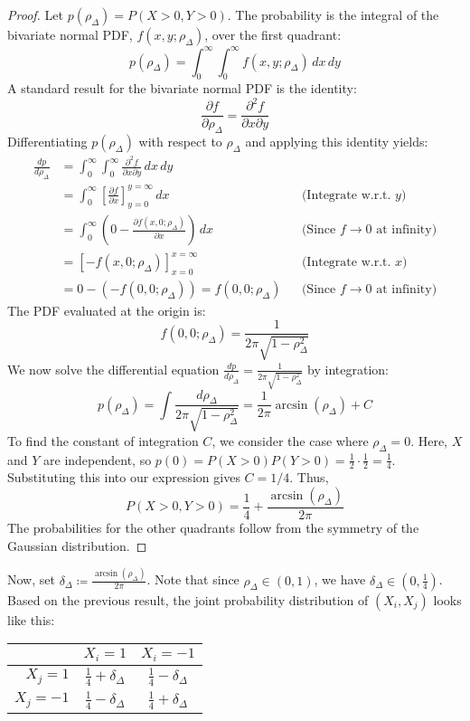 \documentclass[../../main.tex]{subfiles}
\begin{document}
\begin{proof}
Let $p(\rho_\Delta) = P(X > 0, Y > 0)$. The probability is the integral of the bivariate normal PDF, $f(x, y; \rho_\Delta)$, over the first quadrant:
$$
p(\rho_\Delta) = \int_0^\infty \int_0^\infty f(x, y; \rho_\Delta) \,dx\,dy
$$
A standard result for the bivariate normal PDF is the identity:
$$
\frac{\partial f}{\partial \rho_\Delta} = \frac{\partial^2 f}{\partial x \partial y}
$$
Differentiating $p(\rho_\Delta)$ with respect to $\rho_\Delta$ and applying this identity yields:
\begin{align*}
    \frac{dp}{d\rho_\Delta} &= \int_0^\infty \int_0^\infty \frac{\partial^2 f}{\partial x \partial y} \,dx\,dy \\
    &= \int_0^\infty \left[ \frac{\partial f}{\partial x} \right]_{y=0}^{y=\infty} \,dx && \text{(Integrate w.r.t. } y\text{)} \\
    &= \int_0^\infty \left( 0 - \frac{\partial f(x, 0; \rho_\Delta)}{\partial x} \right) \,dx && \text{(Since } f \to 0 \text{ at infinity)} \\
    &= \left[ -f(x, 0; \rho_\Delta) \right]_{x=0}^{x=\infty} && \text{(Integrate w.r.t. } x\text{)} \\
    &= 0 - (-f(0, 0; \rho_\Delta)) = f(0, 0; \rho_\Delta) && \text{(Since } f \to 0 \text{ at infinity)}
\end{align*}
The PDF evaluated at the origin is:
$$
f(0, 0; \rho_\Delta) = \frac{1}{2\pi\sqrt{1-\rho_\Delta^2}}
$$
We now solve the differential equation $\frac{dp}{d\rho_\Delta} = \frac{1}{2\pi\sqrt{1-\rho_\Delta^2}}$ by integration:
$$
p(\rho_\Delta) = \int \frac{d\rho_\Delta}{2\pi\sqrt{1-\rho_\Delta^2}} = \frac{1}{2\pi}\arcsin(\rho_\Delta) + C
$$
To find the constant of integration $C$, we consider the case where $\rho_\Delta = 0$. Here, $X$ and $Y$ are independent, so $p(0) = P(X>0)P(Y>0) = \frac{1}{2} \cdot \frac{1}{2} = \frac{1}{4}$.
Substituting this into our expression gives $C = 1/4$. Thus,
$$
P(X > 0, Y > 0) = \frac{1}{4} + \frac{\arcsin(\rho_\Delta)}{2\pi}
$$
The probabilities for the other quadrants follow from the symmetry of the Gaussian distribution.
\end{proof}

Now, set $\delta_\Delta \coloneqq \frac{\arcsin(\rho_\Delta)}{2\pi}$. Note that since $\rho_\Delta \in (0, 1)$, we have $\delta_\Delta \in (0, \frac{1}{4})$. Based on the previous result, the joint probability distribution of $(X_i, X_j)$ looks like this:
\begin{table}[h]
    \centering
    \begin{tabular}{r|c|c}
        & $X_i = 1$ & $X_i = -1$ \\
        \hline
        \rule{0pt}{15pt} $X_j = 1$ & $\frac{1}{4} + \delta_\Delta$ & $\frac{1}{4} - \delta_\Delta$ \\
        \rule{0pt}{15pt} $X_j = -1$ & $\frac{1}{4} - \delta_\Delta$ & $\frac{1}{4} + \delta_\Delta$
    \end{tabular}
\end{table}
\end{document}
